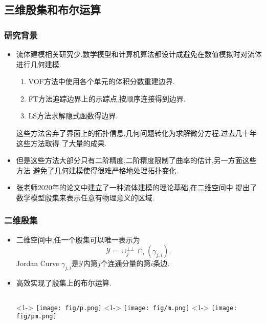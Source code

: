 \documentclass[UTF8]{ctexbeamer}	%
\theoremstyle{plain}
\theoremstyle{definition}
\theoremstyle{remark}
\numberwithin{equation}{section}
\begin{document}
\subsection{三维殷集和布尔运算}
\begin{frame}
    \frametitle{研究背景}
    \begin{itemize}
        \item 流体建模相关研究少,数学模型和计算机算法都设计成避免在数值模拟时对流体
        进行几何建模.
        \begin{enumerate}
            \item VOF方法中使用各个单元的体积分数重建边界.
            \item FT方法追踪边界上的示踪点,按顺序连接得到边界.
            \item LS方法求解隐式函数得边界.
        \end{enumerate}
        这些方法舍弃了界面上的拓扑信息,几何问题转化为求解微分方程.过去几十年这些方法取得
        了大量的成果.
        \item 但是这些方法大部分只有二阶精度,二阶精度限制了曲率的估计,另一方面这些方法
        避免了几何建模使得很难严格地处理拓扑变化.
        \item 张老师2020年的论文中建立了一种流体建模的理论基础,在二维空间中
        提出了数学模型殷集来表示任意有物理意义的区域.
    \end{itemize}
\end{frame}

\begin{frame}
    \frametitle{二维殷集}
    \begin{itemize}
        \item 二维空间中,任一个殷集可以唯一表示为
        \[\mathcal{Y} = \cup_j^{\bot \bot}\cap_i (\gamma_{j, i} ),\]
        Jordan Curve $\gamma_{j, i}$是$\mathcal{Y}$内第$j$个连通分量的第$i$条边.
        \item 高效实现了殷集上的布尔运算. 
        \begin{columns}
            <1->
                \texttt{[image: fig/p.png]}
            <1->
            \texttt{[image: fig/m.png]}
            <1->
            \texttt{[image: fig/pm.png]}
        \end{columns}
    \end{itemize}
\end{frame}
\end{document}

